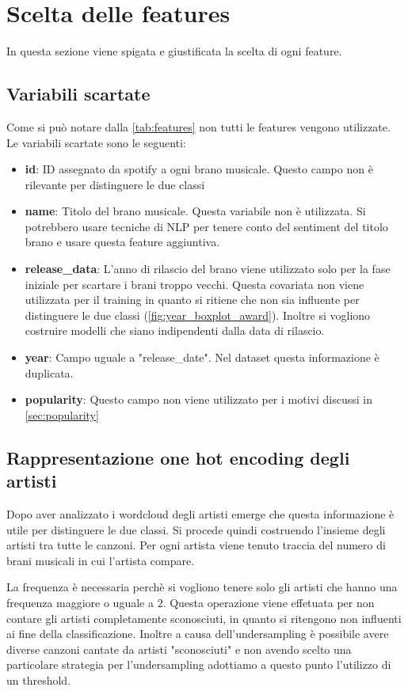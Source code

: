 \section{Scelta delle features}
In questa sezione viene spigata e giustificata la scelta di ogni
feature.

\subsection{Variabili scartate}
Come si può notare dalla \autoref{tab:features} non tutti le features
vengono utilizzate. Le variabili scartate sono le seguenti:

\begin{itemize}
	\item \textbf{id}: ID assegnato da spotify a ogni brano musicale. Questo campo non è rilevante per distinguere le due classi
	\item \textbf{name}: Titolo del brano musicale. Questa variabile non è utilizzata. Si potrebbero usare tecniche di NLP per tenere conto del sentiment del titolo brano e usare questa feature aggiuntiva.
	\item \textbf{release\_data}: 
	L'anno di rilascio del brano viene utilizzato solo per la fase iniziale per scartare i brani troppo vecchi. Questa covariata non viene utilizzata per il training in quanto si ritiene che non sia influente per distinguere le due classi (\autoref{fig:year_boxplot_award}). Inoltre si vogliono costruire modelli che siano indipendenti dalla data di rilascio.
	\item \textbf{year}: Campo uguale a "release\_date". Nel dataset questa informazione è duplicata. 
	\item \textbf{popularity}: Questo campo non viene utilizzato per i motivi discussi in \autoref{sec:popularity}
\end{itemize}


\subsection{Rappresentazione one hot encoding degli artisti}
\label{sec:one}
Dopo aver analizzato i wordcloud degli artisti emerge che questa
informazione è utile per distinguere le due classi. Si procede quindi
costruendo l'insieme degli artisti tra tutte le canzoni. Per ogni
artista viene tenuto traccia del numero di brani musicali in cui
l'artista compare.

La frequenza è necessaria perchè si vogliono tenere solo gli artisti
che hanno una frequenza maggiore o uguale a $2$. Questa operazione
viene effetuata per non contare gli artisti completamente sconosciuti,
in quanto si ritengono non influenti ai fine della classificazione.
Inoltre a causa dell'undersampling è possibile avere diverse canzoni
cantate da artisti "sconosciuti" e non avendo scelto una particolare
strategia per l'undersampling adottiamo a questo punto l'utilizzo di
un threshold.

